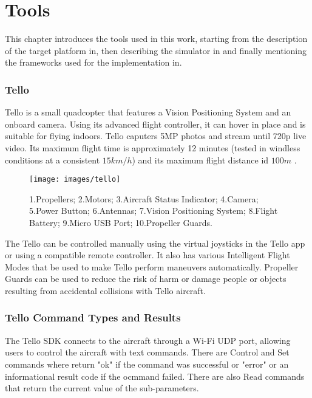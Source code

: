 \chapter{Tools}
\label{chap:impl}

This chapter introduces the tools used in this work, starting from the description of the target platform in, then describing the simulator in and finally mentioning the frameworks used for the implementation in.

\subsection{Tello}
\label{subsec:tello}
Tello is a small quadcopter that features a Vision Positioning System and an onboard camera. Using its advanced flight controller, it can hover in place and is suitable for flying indoors. Tello caputers 5MP photos and stream until 720p live video. Its maximum flight time is approximately 12 minutes (tested in windless conditions at a consistent $15km/h$) and its maximum flight distance id $100m$ \cite[]{djitelloguide}.

\begin{figure}[H]
	\centering
	\texttt{[image: images/tello]}
	\caption[Tello - Aircraft diagram.]{1.Propellers; 2.Motors; 3.Aircraft Status Indicator; 4.Camera; 5.Power Button; 6.Antennas; 7.Vision Positioning System; 8.Flight Battery; 9.Micro USB Port; 10.Propeller Guards.}
	\label{fig:telloairdiagr}
\end{figure}

\noindent The Tello can be controlled manually using the virtual joysticks in the Tello app or using a compatible remote controller. It also has various Intelligent Flight Modes that be used to make Tello perform maneuvers automatically. Propeller Guards can be used to reduce the risk of harm or damage people or objects resulting from accidental collisions with Tello aircraft.

\subsection{Tello Command Types and Results}
\label{subsec:tellosdk}
The Tello SDK connects to the aircraft through a Wi-Fi UDP port, allowing users to control the aircraft with text commands. There are Control and Set commands where return "ok" if the command was successful or "error" or an informational result code if the ocmmand failed. There are also Read commands that return the current value of the sub-parameters.

